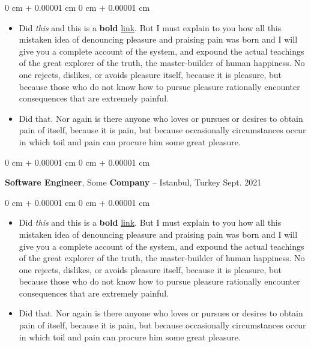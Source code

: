 \documentclass[10pt, letterpaper]{article}
\newenvironment{highlights}{
    \begin{itemize}[
        topsep=0.10 cm,
        parsep=0.10 cm,
        partopsep=0pt,
        itemsep=0pt,
        leftmargin=0 cm + 10pt
    ]
}{
    \end{itemize}
} %
\newenvironment{onecolentry}{
    \begin{adjustwidth}{
        0 cm + 0.00001 cm
    }{
        0 cm + 0.00001 cm
    }
}{
    \end{adjustwidth}
} %
\newenvironment{twocolentry}[2][]{
    \onecolentry
    \def\secondColumn{#2}
    \setcolumnwidth{\fill, 4.5 cm}
    \begin{paracol}{2}
}{
    \switchcolumn \raggedleft \secondColumn
    \end{paracol}
    \endonecolentry
} %
\begin{document}
        \vspace{0.10 cm}
        \begin{onecolentry}
            \begin{highlights}
                \item Did \textit{this} and this is a \textbf{bold} \href{https://example.com}{link}. But I must explain to you how all this mistaken idea of denouncing pleasure and praising pain was born and I will give you a complete account of the system, and expound the actual teachings of the great explorer of the truth, the master-builder of human happiness. No one rejects, dislikes, or avoids pleasure itself, because it is pleasure, but because those who do not know how to pursue pleasure rationally encounter consequences that are extremely painful.
                \item Did that. Nor again is there anyone who loves or pursues or desires to obtain pain of itself, because it is pain, but because occasionally circumstances occur in which toil and pain can procure him some great pleasure.
            \end{highlights}
        \end{onecolentry}


        \vspace{0.2 cm}

        \begin{twocolentry}{
            Sept. 2021
        }
            \textbf{Software Engineer}, Some \textbf{Company} -- Istanbul, Turkey\end{twocolentry}

        \vspace{0.10 cm}
        \begin{onecolentry}
            \begin{highlights}
                \item Did \textit{this} and this is a \textbf{bold} \href{https://example.com}{link}. But I must explain to you how all this mistaken idea of denouncing pleasure and praising pain was born and I will give you a complete account of the system, and expound the actual teachings of the great explorer of the truth, the master-builder of human happiness. No one rejects, dislikes, or avoids pleasure itself, because it is pleasure, but because those who do not know how to pursue pleasure rationally encounter consequences that are extremely painful.
                \item Did that. Nor again is there anyone who loves or pursues or desires to obtain pain of itself, because it is pain, but because occasionally circumstances occur in which toil and pain can procure him some great pleasure.
            \end{highlights}
        \end{onecolentry}
\end{document}
